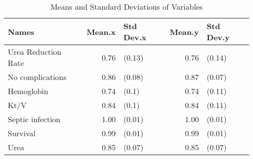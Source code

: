 \begin{table}[ht]
\centering
\caption{Means and Standard Deviations of Variables} 
\begin{tabular}{lrlrl}
  \hline
Names & Mean.x & Std Dev.x & Mean.y & Std Dev.y \\ 
  \hline
Urea Reduction Rate & 0.76 & (0.13) & 0.76 & (0.14) \\ 
  No complications & 0.86 & (0.08) & 0.87 & (0.07) \\ 
  Hemoglobin & 0.74 & (0.1) & 0.74 & (0.11) \\ 
  Kt/V & 0.84 & (0.1) & 0.84 & (0.11) \\ 
  Septic infection & 1.00 & (0.01) & 1.00 & (0.01) \\ 
  Survival & 0.99 & (0.01) & 0.99 & (0.01) \\ 
  Urea & 0.85 & (0.07) & 0.85 & (0.07) \\ 
   \hline
\end{tabular}
\end{table}
